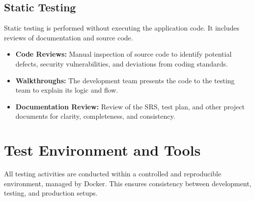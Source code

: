 \subsection{Static Testing}
Static testing is performed without executing the application code. It includes reviews of documentation and source code.
\begin{itemize}
    \item \textbf{Code Reviews:} Manual inspection of source code to identify potential defects, security vulnerabilities, and deviations from coding standards.
    \item \textbf{Walkthroughs:} The development team presents the code to the testing team to explain its logic and flow.
    \item \textbf{Documentation Review:} Review of the SRS, test plan, and other project documents for clarity, completeness, and consistency.
\end{itemize}


\section{Test Environment and Tools}
All testing activities are conducted within a controlled and reproducible environment, managed by Docker. This ensures consistency between development, testing, and production setups.

